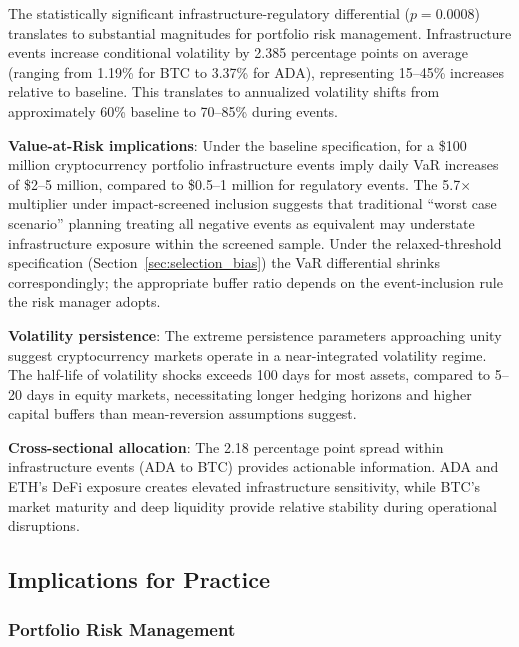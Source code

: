 \documentclass[pdflatex,sn-mathphys-num]{sn-jnl}
\theoremstyle{thmstyleone}
\theoremstyle{thmstyletwo}
\theoremstyle{thmstylethree}
\begin{document}
The statistically significant infrastructure-regulatory differential ($p=0.0008$) translates to substantial magnitudes for portfolio risk management. Infrastructure events increase conditional volatility by 2.385 percentage points on average (ranging from 1.19\% for BTC to 3.37\% for ADA), representing 15--45\% increases relative to baseline. This translates to annualized volatility shifts from approximately 60\% baseline to 70--85\% during events.

\textbf{Value-at-Risk implications}: Under the baseline specification, for a \$100 million cryptocurrency portfolio infrastructure events imply daily VaR increases of \$2--5 million, compared to \$0.5--1 million for regulatory events. The 5.7$\times$ multiplier under impact-screened inclusion suggests that traditional ``worst case scenario'' planning treating all negative events as equivalent may understate infrastructure exposure within the screened sample. Under the relaxed-threshold specification (Section~\ref{sec:selection_bias}) the VaR differential shrinks correspondingly; the appropriate buffer ratio depends on the event-inclusion rule the risk manager adopts.

\textbf{Volatility persistence}: The extreme persistence parameters approaching unity suggest cryptocurrency markets operate in a near-integrated volatility regime. The half-life of volatility shocks exceeds 100 days for most assets, compared to 5--20 days in equity markets, necessitating longer hedging horizons and higher capital buffers than mean-reversion assumptions suggest.

\textbf{Cross-sectional allocation}: The 2.18 percentage point spread within infrastructure events (ADA to BTC) provides actionable information. ADA and ETH's DeFi exposure creates elevated infrastructure sensitivity, while BTC's market maturity and deep liquidity provide relative stability during operational disruptions.

\subsection{Implications for Practice}

\subsubsection{Portfolio Risk Management}
\end{document}
